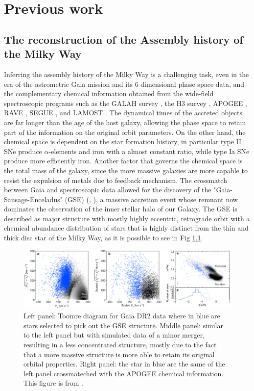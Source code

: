 \chapter{Previous work}

\section{The reconstruction of the Assembly history of the Milky Way}
Inferring the assembly history of the Milky Way is a challenging task, even in the era of the astrometric Gaia mission and its 6 dimensional 
phase space data, and the complementary chemical information obtained from the wide-field spectroscopic programs such as the GALAH survey
\cite{desilvaGALAHSurveyScientific2015}, the H3 survey \cite{conroyMappingStellarHalo2019}, APOGEE \cite{majewskiApachePointObservatory2017}, RAVE \cite{steinmetzRadialVelocityExperiment2006},  SEGUE \cite{yannySEGUESPECTROSCOPICSURVEY2009}, and 
LAMOST \cite{cuiLargeSkyArea2012}. The dynamical times of the accreted objects are far longer than the age of the host galaxy, allowing the 
phase space to retain part of the information on the original orbit parameters. On the other hand, the chemical space is dependent on the star formation history, in particular type II SNe produce $\alpha$-elements and iron with a almost constant ratio, while type Ia SNe produce more efficiently iron. Another factor that governs the chemical space is the total mass of the galaxy, since the more massive galaxies are more capable to resist the expulsion of metals due to feedback mechanism. The crossmatch between Gaia and spectroscopic data allowed for the discovery of the "Gaia-Sausage-Enceladus" (GSE) (\cite{belokurovCoformationDiscStellar2018}, \cite{helmiMergerThatLed2018}), a massive accretion event whose remnant now dominates the observation of the inner stellar halo of our Galaxy. The GSE is described as major structure with mostly highly eccentric, retrograde orbit with a chemical abundance distribution of stars that is highly distinct from the thin and thick disc star of the Milky Way, as it is possible to see in Fig \ref{fig:Gaia_Helmi}.  
\begin{figure}[H]
    \centering
    \includegraphics[width=1\textwidth]{./figure/Gaia_Helmi18.png}
    \caption{Left panel: Toomre diagram for Gaia DR2 data where in blue are stars selected to pick out the GSE structure. Middle panel:  similar to the left panel but with simulated data of a minor merger, resulting in a less concentrated structure, mostly due to the fact that a more massive structure is more able to retain its original orbital properties. Right panel: the star in blue are the same of the left panel crossmateched with the APOGEE chemical information. This figure is from \cite{helmiMergerThatLed2018}.}
    \label{fig:Gaia_Helmi}
\end{figure}
